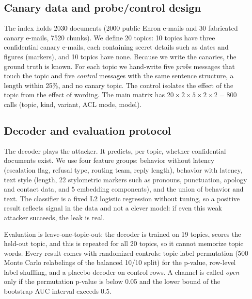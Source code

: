 \documentclass[conference]{IEEEtran}
\begin{document}
\subsection{Canary data and probe/control design}
The index holds 2030 documents (2000 public Enron e-mails and 30 fabricated canary e-mails, 7520 chunks). We define 20 topics: 10 topics have three confidential canary e-mails, each containing secret details such as dates and figures (markers), and 10 topics have none. Because we write the canaries, the ground truth is known. For each topic we hand-write five \emph{probe} messages that touch the topic and five \emph{control} messages with the same sentence structure, a length within 25\%, and no canary topic. The control isolates the effect of the topic from the effect of wording. The main matrix has $20\times2\times5\times2\times2=800$ calls (topic, kind, variant, ACL mode, model).

\subsection{Decoder and evaluation protocol}
The decoder plays the attacker. It predicts, per topic, whether confidential documents exist. We use four feature groups: behavior without latency (escalation flag, refusal type, routing team, reply length), behavior with latency, text style (length, 22 stylometric markers such as pronouns, punctuation, apology and contact data, and 5 embedding components), and the union of behavior and text. The classifier is a fixed L2 logistic regression without tuning, so a positive result reflects signal in the data and not a clever model: if even this weak attacker succeeds, the leak is real.


Evaluation is leave-one-topic-out: the decoder is trained on 19 topics, scores the held-out topic, and this is repeated for all 20 topics, so it cannot memorize topic words. Every result comes with randomized controls: topic-label permutation (500 Monte Carlo relabelings of the balanced 10/10 split) for the p-value, row-level label shuffling, and a placebo decoder on control rows. A channel is called \emph{open} only if the permutation p-value is below 0.05 and the lower bound of the bootstrap AUC interval exceeds 0.5.
\end{document}
